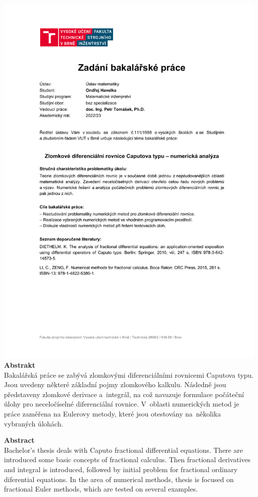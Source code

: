\documentclass[a4paper,12pt,twoside]{article}
\theoremstyle{definition}
\theoremstyle{remark}
\numberwithin{equation}{section}
\numberwithin{table}{section}
\numberwithin{figure}{section}
\begin{document}
\newpage
\thispagestyle{empty}
\
\newpage
\includegraphics[width = \textwidth]{zav_prace__6a47feaede907e7e33a4b03780487b63.pdf}
\newpage
\thispagestyle{empty}
\noindent
{\bf Abstrakt}\\[1mm]
Bakalářská práce se zabývá zlomkovými diferenciálními rovnicemi Caputova typu. Jsou uvedeny některé základní pojmy zlomkového kalkulu. Následně jsou představeny zlomkové derivace a~integrál, na což navazuje formulace počáteční úlohy pro neceločíselné diferenciální rovnice. V~oblasti numerických metod je práce zaměřena na Eulerovy metody, které jsou otestovány na~několika vybraných úlohách.

\vspace{1cm}\noindent
{\bf Abstract}\\[1mm]
Bachelor's thesis deals with Caputo fractional differential equations. There are introduced some basic concepts of fractional calculus. Then fractional derivatives and integral is introduced, followed by initial problem for fractional ordinary diferential equations. In the area of numerical methods, thesis is focused on fractional Euler methods, which are tested on several examples.
\end{document}
